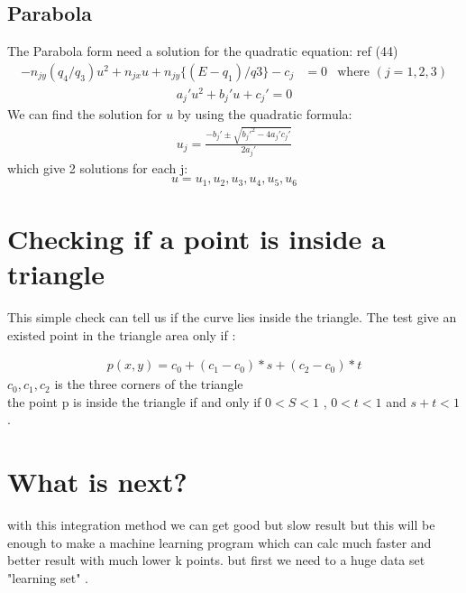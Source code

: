 \documentclass[11pt,a4paper]{article}
\begin{document}
\subsection{Parabola}
The Parabola form need a solution for the quadratic equation: ref (44)
\begin{align}
-n_{jy}(q_4 / q_3)u^2 + n_{jx}u + n_{jy} \{(E-q_1)/q3 \} - c_j &= 0  &\text{where  } (j = 1,2,3)
\end{align}
\begin{align}
a_j'u^2 + b_j'u + c_j' = 0
\end{align}
We can find the solution for $u$ by using the quadratic formula:
\begin{align}
u_j = \frac{-b_j ' \pm \sqrt{b_j '^2 - 4a_j'c_j'} }{2a_j'}
\end{align}
which give 2 solutions for each j:
\begin{equation}
u = u_1,u_2,u_3,u_4,u_5,u_6
\end{equation}

\section{Checking if a point is inside a triangle}
This simple check can tell us if the curve lies inside the triangle. The test give an existed point in the triangle area only if :

 \begin{align}
p(x,y) = c_0 + (c_1 - c_0) * s + (c_2 - c_0) * t
\end{align}
$c_0,c_1,c_2$ is the three corners of the triangle\\
the point p is inside the triangle if and only if $ 0 <  S  < 1$ ,  $0 < t < 1 $  and $s+t< 1$.

\section{What is next?}
with this integration method we can get good but slow result but this will be enough to make a machine learning program which can calc much faster and better result with much lower k points. but first we need to a huge data set "learning set" .
\end{document}
